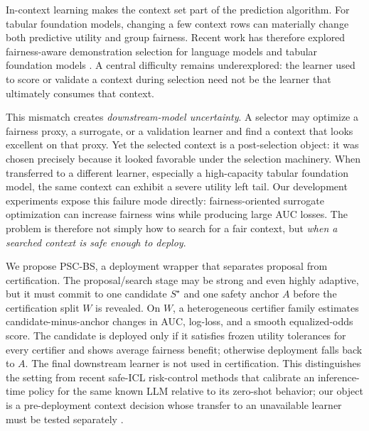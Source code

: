 \documentclass[10pt]{article}
\newcommand{\PSC}{\textsc{PSC-BS}}
\begin{document}
In-context learning makes the context set part of the prediction algorithm.
For tabular foundation models, changing a few context rows can materially change both predictive utility and group fairness.
Recent work has therefore explored fairness-aware demonstration selection for language models and tabular foundation models \citep{hu2024strategic,kenfack2026fairtabicl,chhikara2025smite}.
A central difficulty remains underexplored: the learner used to score or validate a context during selection need not be the learner that ultimately consumes that context.

This mismatch creates \emph{downstream-model uncertainty}.
A selector may optimize a fairness proxy, a surrogate, or a validation learner and find a context that looks excellent on that proxy.
Yet the selected context is a post-selection object: it was chosen precisely because it looked favorable under the selection machinery.
When transferred to a different learner, especially a high-capacity tabular foundation model, the same context can exhibit a severe utility left tail.
Our development experiments expose this failure mode directly: fairness-oriented surrogate optimization can increase fairness wins while producing large AUC losses.
The problem is therefore not simply how to search for a fair context, but \emph{when a searched context is safe enough to deploy}.

We propose \PSC{}, a deployment wrapper that separates proposal from certification.
The proposal/search stage may be strong and even highly adaptive, but it must commit to one candidate $S^\star$ and one safety anchor $A$ before the certification split $W$ is revealed.
On $W$, a heterogeneous certifier family estimates candidate-minus-anchor changes in AUC, log-loss, and a smooth equalized-odds score.
The candidate is deployed only if it satisfies frozen utility tolerances for every certifier and shows average fairness benefit; otherwise deployment falls back to $A$.
The final downstream learner is not used in certification.
This distinguishes the setting from recent safe-ICL risk-control methods that calibrate an inference-time policy for the same known LLM relative to its zero-shot behavior; our object is a pre-deployment context decision whose transfer to an unavailable learner must be tested separately \citep{wynn2026corrupted}.
\end{document}
